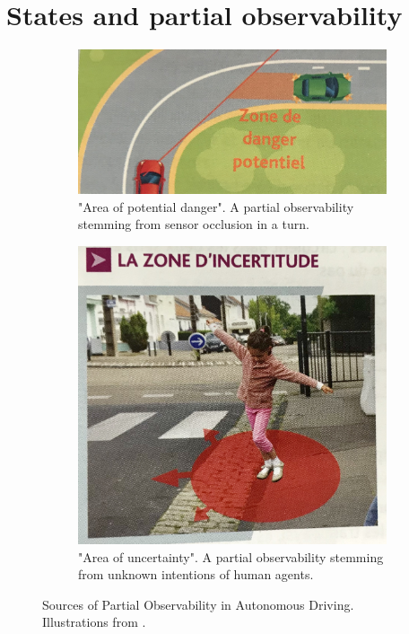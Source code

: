 \section{States and partial observability}

\begin{figure}[th]
	\centering
	\begin{subfigure}[b]{.7\linewidth}
		\includegraphics[width=\linewidth]{img/po-sensors}
		\caption{"Area of potential danger". A partial observability stemming from sensor occlusion in a turn.}
		\label{fig:po-occlusion}
	\end{subfigure}
	\begin{subfigure}[b]{.4\linewidth}
		\includegraphics[width=\linewidth]{img/po-intentions}
		\caption{"Area of uncertainty". A partial observability stemming from unknown intentions of human agents.}
		\label{fig:po-intentions}
	\end{subfigure}
	\caption{Sources of Partial Observability in Autonomous Driving. Illustrations from \citep{ObjCode2017}.}
	\label{fig:partial-observability}
\end{figure}
